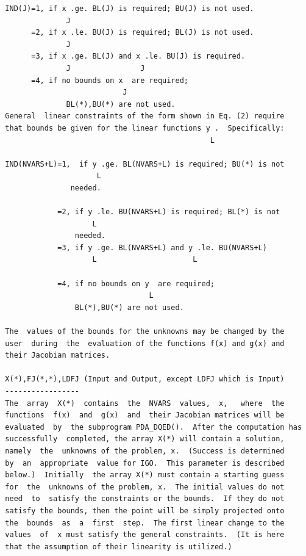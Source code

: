 \documentclass[11pt,twoside]{article}
\begin{document}
\begin{verbatim}
  IND(J)=1, if x .ge. BL(J) is required; BU(J) is not used.
                J
        =2, if x .le. BU(J) is required; BL(J) is not used.
                J
        =3, if x .ge. BL(J) and x .le. BU(J) is required.
                J                J
        =4, if no bounds on x  are required;
                             J
                BL(*),BU(*) are not used.
  General  linear constraints of the form shown in Eq. (2) require
  that bounds be given for the linear functions y .  Specifically:
                                                 L

  IND(NVARS+L)=1,  if y .ge. BL(NVARS+L) is required; BU(*) is not
                       L
                 needed.

              =2, if y .le. BU(NVARS+L) is required; BL(*) is not
                      L
                  needed.
              =3, if y .ge. BL(NVARS+L) and y .le. BU(NVARS+L)
                      L                      L

              =4, if no bounds on y  are required;
                                   L
                  BL(*),BU(*) are not used.

  The  values of the bounds for the unknowns may be changed by the
  user  during  the  evaluation of the functions f(x) and g(x) and
  their Jacobian matrices.

  X(*),FJ(*,*),LDFJ (Input and Output, except LDFJ which is Input)
  -----------------
  The  array  X(*)  contains  the  NVARS  values,  x,   where  the
  functions  f(x)  and  g(x)  and  their Jacobian matrices will be
  evaluated  by  the subprogram PDA_DQED().  After the computation has
  successfully  completed, the array X(*) will contain a solution,
  namely  the  unknowns of the problem, x.  (Success is determined
  by  an  appropriate  value for IGO.  This parameter is described
  below.)  Initially  the array X(*) must contain a starting guess
  for  the  unknowns of the problem, x.  The initial values do not
  need  to  satisfy the constraints or the bounds.  If they do not
  satisfy the bounds, then the point will be simply projected onto
  the  bounds  as  a  first  step.  The first linear change to the
  values  of  x must satisfy the general constraints.  (It is here
  that the assumption of their linearity is utilized.)


\end{verbatim}
\end{document}
